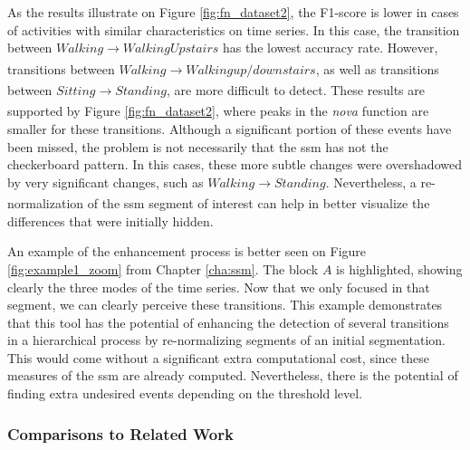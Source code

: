 As the results illustrate on Figure \ref{fig:fn_dataset2}, the F1-score is lower in cases of activities with similar characteristics on time series. In this case, the transition between $Walking \xrightarrow[]{} Walking Upstairs$ has the lowest accuracy rate. However, transitions between $Walking \xrightarrow[]{} Walking up/downstairs$, as well as transitions between $Sitting \xrightarrow[]{} Standing$, are more difficult to detect. These results are supported by Figure \ref{fig:fn_dataset2}, where peaks in the \textit{nova} function are smaller for these transitions. Although a significant portion of these events have been missed, the problem is not necessarily that the \gls{ssm} has not the checkerboard pattern. In this cases, these more subtle changes were overshadowed by very significant changes, such as $Walking \xrightarrow[]{} Standing$. Nevertheless, a re-normalization of the \gls{ssm} segment of interest can help in better visualize the differences that were initially hidden. 
\par
An example of the enhancement process is better seen on Figure \ref{fig:example1_zoom} from Chapter \ref{cha:ssm}. The block $A$ is highlighted, showing clearly the three modes of the time series. Now that we only focused in that segment, we can clearly perceive these transitions. This example demonstrates that this tool has the potential of enhancing the detection of several transitions in a hierarchical process by re-normalizing segments of an initial segmentation. This would come without a significant extra computational cost, since these measures of the \gls{ssm} are already computed. Nevertheless, there is the potential of finding extra undesired events depending on the threshold level.

\subsubsection{Comparisons to Related Work}


